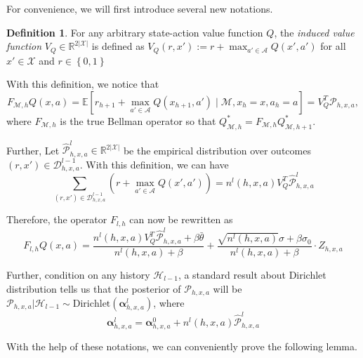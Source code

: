 \documentclass[letterpaper]{article} %
\newcommand{\Sp}[1]{\left(#1\right)}
\newcommand{\Mp}[1]{\left[#1\right]}
\newcommand{\Bp}[1]{\left\{#1\right\}}
\newcommand{\abs}[1]{\left|#1\right|}
\newcommand{\E}{\mathbb{E}}
\newcommand{\R}{\mathbb{R}}
\newcommand{\M}{\mathcal{M}}
\newcommand{\aX}{\abs{\mathcal{X}}}
\newcommand{\hatp}{\widehat{\mathcal{P}}}
\theoremstyle{definition}
\newtheorem{definition}{Definition}
\begin{document}
For convenience, we will first introduce several new notations. 
\begin{definition}
    For any arbitrary state-action value function $Q$, the \textit{induced value function} $V_Q\in\R^{2\aX}$ is defined as $V_Q\Sp{r, x'}:=r+\max_{a'\in\mathcal{A}}Q\Sp{x', a'}$ for all $x'\in\mathcal{X}$ and $r\in\Bp{0, 1}$
\end{definition}
With this definition, we notice that
\begin{equation}
\label{equ:FM}
    F_{\M, h}Q\Sp{x, a}=\E\Mp{r_{h+1}+\max_{a'\in\mathcal{A}}Q\Sp{x_{h+1}, a'}\mid\M, x_{h}=x, a_{h}=a}=V_Q^T\mathcal{P}_{h, x, a},
\end{equation}
where $F_{\M, h}$ is the true Bellman operator so that $Q^*_{\M, h}=F_{\M, h}Q^*_{\M, h+1}$.

Further, Let $\hatp^l_{h, x, a}\in\R^{2\abs{\mathcal{X}}}$ be the empirical distribution over outcomes $\Sp{r, x'}\in\mathcal{D}^{l-1}_{h, x, a}$. With this definition, we can have 
$$\sum_{\Sp{r, x'}\in\mathcal{D}^{l-1}_{h, x, a}}\Sp{r+\max_{a'\in\mathcal{A}}Q\Sp{x', a'}}=n^l\Sp{h, x, a}V_Q^T\hatp^l_{h, x, a}$$

Therefore, the operator $F_{l, h}$ can now be rewritten as
\begin{equation}
\label{equ:new_f_op}
    F_{l, h}Q\Sp{x, a}=\frac{n^l\Sp{h, x, a}V_Q^T\hatp^l_{h, x, a}+\beta\bar{\theta}}{n^l\Sp{h, x, a}+\beta}+\frac{\sqrt{n^l\Sp{h, x, a}}\sigma+\beta\sigma_0}{n^l\Sp{h, x, a}+\beta}\cdot Z_{h, x, a}
\end{equation}

Further, condition on any history $\mathcal{H}_{l-1}$, a standard result about Dirichlet distribution tells us that the posterior of $\mathcal{P}_{h, x, a}$ will be $\mathcal{P}_{h, x, a}|\mathcal{H}_{l-1}\sim\text{Dirichlet}\Sp{\bm{\alpha}^l_{h, x, a}}$, where 
$$\bm{\alpha}^l_{h, x, a}=\bm{\alpha}^0_{h, x, a}+n^l\Sp{h, x, a}\hatp^l_{h, x, a}$$

With the help of these notations, we can conveniently prove the following lemma. 
\end{document}
